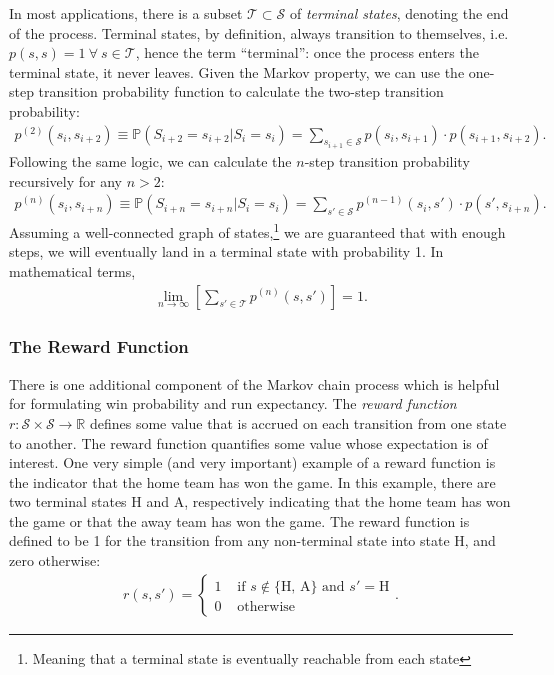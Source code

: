 \documentclass{article}
\begin{document}
    In most applications, there is a subset $\mathcal T \subset \mathcal S$ of {\it terminal states}, denoting the end of the process. Terminal states, by definition, always transition to themselves, i.e. $p(s, s) = 1 ~\forall~s\in \mathcal T$, hence the term ``terminal'': once the process enters the terminal state, it never leaves. Given the Markov property, we can use the one-step transition probability function to calculate the two-step transition probability:
    \begin{align*}
      p^{(2)}(s_i, s_{i+2}) \equiv \mathbb{P}(S_{i+2} = s_{i+2} | S_i = s_i) = \sum_{s_{i+1} \in \mathcal S} p(s_i, s_{i+1}) \cdot p(s_{i+1}, s_{i+2}).
    \end{align*}
    Following the same logic, we can calculate the $n$-step transition probability recursively for any $n > 2$:
    \begin{align*}
      p^{(n)}(s_i, s_{i+n}) \equiv \mathbb{P}(S_{i+n} = s_{i+n} | S_i = s_i) = \sum_{s' \in \mathcal S} p^{(n-1)}(s_i, s') \cdot p(s', s_{i+n}).
    \end{align*}
    Assuming a well-connected graph of states,\footnote{Meaning that a terminal state is eventually reachable from each state} we are guaranteed that with enough steps, we will eventually land in a terminal state with probability 1. In mathematical terms,
    \begin{align*}
      \lim_{n\rightarrow\infty} \left[\sum_{s' \in \mathcal T} p^{(n)}(s, s')\right] = 1.
    \end{align*}

    \subsubsection{\sc The Reward Function}

      There is one additional component of the Markov chain process which is helpful for formulating win probability and run expectancy. The {\it reward function} $r : \mathcal S \times \mathcal S \rightarrow \mathbb{R}$ defines some value that is accrued on each transition from one state to another. The reward function quantifies some value whose expectation is of interest. One very simple (and very important) example of a reward function is the indicator that the home team has won the game. In this example, there are two terminal states H and A, respectively indicating that the home team has won the game or that the away team has won the game. The reward function is defined to be 1 for the transition from any non-terminal state into state H, and zero otherwise:
      \begin{align}
        \label{eqn:reward-home-win}
        r(s, s') = \begin{cases}
          1 & \mbox{ if } s \notin \{\mbox{H, A}\} \mbox{ and } s' = \mbox{H}\\
          0 & \mbox{ otherwise}
        \end{cases}.
      \end{align}
\end{document}

